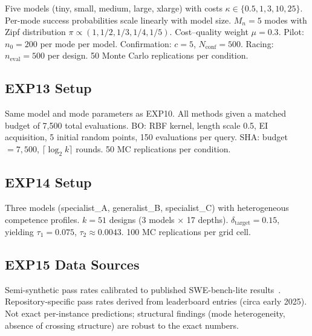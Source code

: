 \documentclass[11pt]{article}
\newcommand{\Mn}{M_n}
\newcommand{\dtarget}{\delta_{\mathrm{target}}}
\begin{document}
Five models (tiny, small, medium, large, xlarge) with costs
$\kappa \in \{0.5, 1, 3, 10, 25\}$.
Per-mode success probabilities scale linearly with model size.
$\Mn{=}5$ modes with Zipf distribution
$\pi \propto (1, 1/2, 1/3, 1/4, 1/5)$.
Cost--quality weight $\mu = 0.3$.
Pilot: $n_0 = 200$ per mode per model.
Confirmation: $c = 5$, $N_{\mathrm{conf}} = 500$.
Racing: $n_{\mathrm{eval}} = 500$ per design.
50 Monte Carlo replications per condition.

\subsection{EXP13 Setup}

Same model and mode parameters as EXP10.
All methods given a matched budget of 7,500 total evaluations.
BO: RBF kernel, length scale 0.5, EI acquisition, 5 initial random
points, 150 evaluations per query.
SHA: budget $= 7{,}500$, $\lceil\log_2 k\rceil$ rounds.
50 MC replications per condition.

\subsection{EXP14 Setup}

Three models (specialist\_A, generalist\_B, specialist\_C) with
heterogeneous competence profiles.
$k = 51$ designs (3 models $\times$ 17 depths).
$\dtarget = 0.15$, yielding $\tau_1 = 0.075$, $\tau_2 \approx 0.0043$.
100 MC replications per grid cell.

\subsection{EXP15 Data Sources}

Semi-synthetic pass rates calibrated to published SWE-bench-lite
results~\citep{jimenez2024swebench}.
Repository-specific pass rates derived from leaderboard entries
(circa early 2025).
Not exact per-instance predictions; structural findings (mode
heterogeneity, absence of crossing structure) are robust to the
exact numbers.
\end{document}
